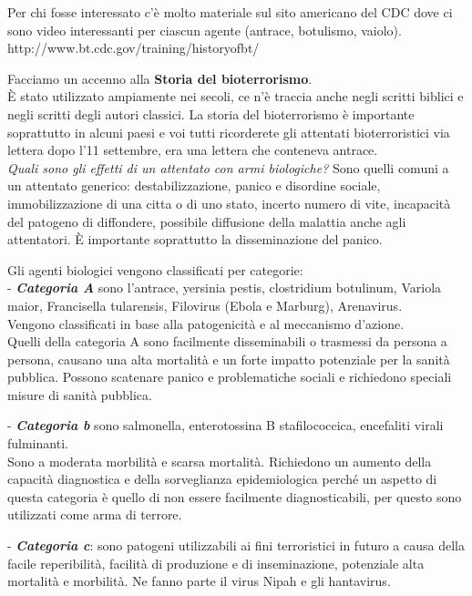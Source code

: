 \documentclass[]{article}
\begin{document}
Per chi fosse interessato c'è molto materiale sul sito americano del CDC
dove ci sono video interessanti per ciascun agente (antrace, botulismo,
vaiolo). http://www.bt.cdc.gov/training/historyofbt/

Facciamo un accenno alla \textbf{Storia del bioterrorismo}.\\
È stato utilizzato ampiamente nei secoli, ce n'è traccia anche negli
scritti biblici e negli scritti degli autori classici. La storia del
bioterrorismo è importante soprattutto in alcuni paesi e voi tutti
ricorderete gli attentati bioterroristici via lettera dopo l'11
settembre, era una lettera che conteneva antrace.\\
\emph{Quali sono gli effetti di un attentato con armi biologiche?} Sono
quelli comuni a un attentato generico: destabilizzazione, panico e
disordine sociale, immobilizzazione di una citta o di uno stato, incerto
numero di vite, incapacità del patogeno di diffondere, possibile
diffusione della malattia anche agli attentatori. È importante
soprattutto la disseminazione del panico.

Gli agenti biologici vengono classificati per categorie:\\
- \textbf{\emph{Categoria A}} sono l'antrace, yersinia pestis,
clostridium botulinum, Variola maior, Francisella tularensis, Filovirus
(Ebola e Marburg), Arenavirus.\\
Vengono classificati in base alla patogenicità e al meccanismo
d'azione.\\
Quelli della categoria A sono facilmente disseminabili o trasmessi da
persona a persona, causano una alta mortalità e un forte impatto
potenziale per la sanità pubblica. Possono scatenare panico e
problematiche sociali e richiedono speciali misure di sanità pubblica.

- \textbf{\emph{Categoria b}} sono salmonella, enterotossina B
stafilococcica, encefaliti virali fulminanti.\\
Sono a moderata morbilità e scarsa mortalità. Richiedono un aumento
della capacità diagnostica e della sorveglianza epidemiologica perché un
aspetto di questa categoria è quello di non essere facilmente
diagnosticabili, per questo sono utilizzati come arma di terrore.

- \textbf{\emph{Categoria c}}: sono patogeni utilizzabili ai fini
terroristici in futuro a causa della facile reperibilità, facilità di
produzione e di inseminazione, potenziale alta mortalità e morbilità. Ne
fanno parte il virus Nipah e gli hantavirus.
\end{document}
